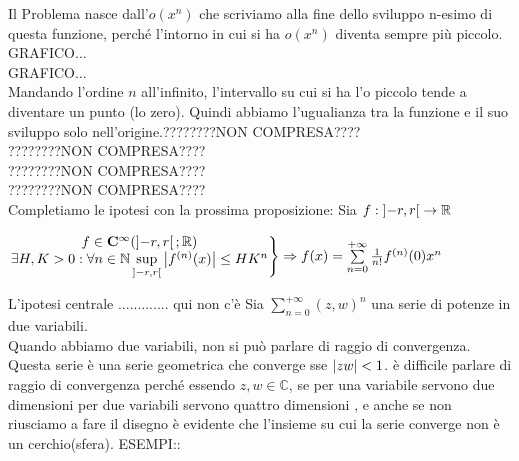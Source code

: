 Il Problema nasce dall'$o(x^n)$ che scriviamo alla fine dello sviluppo n-esimo di questa funzione, perché l'intorno in cui si ha $o(x^n)$ diventa sempre più piccolo.
GRAFICO...\\
GRAFICO...\\
Mandando l'ordine $n$ all'infinito, l'intervallo su cui si ha l'o piccolo tende a diventare un punto (lo zero). Quindi abbiamo l'ugualianza tra la funzione e il suo sviluppo solo nell'origine.????????NON COMPRESA????\\
????????NON COMPRESA????\\
????????NON COMPRESA????\\
????????NON COMPRESA????\\
Completiamo le ipotesi con la prossima proposizione:
\proposition
Sia $f:\left]-r,r\right[\to \mathbb{R}$
\begin{center}
	$\left.\begin{matrix}
	f\in \mathbf{C^{\infty}}(\left]-r,r\right[; \mathbb{R})\\
	\exists H,K >0 :\forall n\in\mathbb{N} \sup\limits_{\left]-r,r\right[}\left|f^{(n)}(x)\right|\le HK^n\\
	\end{matrix}\right\}
	\Rightarrow f(x)=\sum\limits_{n=0}^{+\infty}\frac{1}{n!}f^{(n)}(0)x^n$
\end{center}
\observation
L'ipotesi centrale ............. qui non c'è
\observation
Sia $\sum\limits_{n=0}^{+\infty}(z,w)^n$ una serie di potenze in due variabili.\\
Quando abbiamo due variabili, non si può parlare di raggio di convergenza. Questa serie è una serie geometrica che converge sse $\left|zw\right|<1$. è  difficile parlare di raggio di convergenza  perché essendo $z,w\in\mathbb{C}$, se per una variabile servono due dimensioni per due variabili servono quattro dimensioni , e anche se non riusciamo a fare il disegno è evidente che l'insieme su cui la serie converge non è un cerchio(sfera).
ESEMPI::
